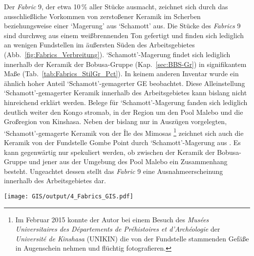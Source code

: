Der \textit{Fabric} 9, der etwa 10\,\% aller Stücke ausmacht, zeichnet sich durch das ausschließliche Vorkommen von zerstoßener Keramik im Scherben beziehungsweise einer \enquote*{Magerung} aus \enquote*{Schamott} aus. Die Stücke des \textit{Fabrics} 9 sind durchweg aus einem weißbrennenden Ton gefertigt und finden sich lediglich an wenigen Fundstellen im äußersten Süden des Arbeitsgebietes (Abb.~\ref{fig:Fabrics_Verbreitung}). \enquote*{Schamott}-Magerung findet sich lediglich innerhalb der Keramik der Bobusa-Gruppe (Kap.~\ref{sec:BBS-Gr}) in signifikantem Maße (Tab.~\ref{tab:Fabrics_StilGr_Pct}). In keinem anderen Inventar wurde ein ähnlich hoher Anteil \enquote*{Schamott}-gemagerter GE beobachtet. Diese Alleinstellung \enquote*{Schamott}-gemagerter Keramik innerhalb des Arbeitsgebietes kann bislang nicht hinreichend erklärt werden. Belege für \enquote*{Schamott}-Magerung fanden sich lediglich deutlich weiter den Kongo stromab, in der Region um den Pool Malebo und die Großregion von Kinshasa. Neben der bislang nur in Auszügen vorgelegten, \enquote*{Schamott}-gemagerte Keramik von der Île des Mimosas \parencite[Abb.~\ref{fig:Mimosas_Mim26}; siehe][279f.]{Eggert.1984}\footnote{Im Februar 2015 konnte der Autor bei einem Besuch des \textit{Musées Universitaires des Départements de Préhistoires et d'Archéologie} der \textit{Université de Kinshasa} (UNIKIN) die von der Fundstelle stammenden Gefäße in Augenschein nehmen und flüchtig fotografieren.} zeichnet sich auch die Keramik von der Fundstelle Gombe Point durch \enquote*{Schamott}-Magerung aus \parencite[586]{Cahen.1976}. Es kann gegenwärtig nur spekuliert werden, ob zwischen der Keramik der Bobusa-Gruppe und jener aus der Umgebung des Pool Malebo ein Zusammenhang besteht. Ungeachtet dessen stellt das \textit{Fabric} 9 eine Ausnahmeerscheinung innerhalb des Arbeitsgebietes dar. 

\begin{figure*}[p]
	\centering
	\texttt{[image: GIS/output/4\_Fabrics\_GIS.pdf]}
	\caption{\textit{Fabrics}: Anteilige Verbreitung im Arbeitsgebiet. Kartiert sind ausschließlich Fundplätze mit mehr als 5~GE. Für das östlich angrenzende Innere Kongobecken \parencite[siehe][]{Wotzka.1995} kann mangels entsprechender Untersuchungen eine flächige Verbreitung des \textit{Fabric} 1 lediglich angenommen werden (siehe auch Anm.~\ref{ftn:Sandmagerung}).}
	\label{fig:Fabrics_Verbreitung}
\end{figure*}

\begin{table*}[!tb]
	\centering
	{\small
		
	}
	\caption{\textit{Fabrics}: Prozentualer Anteil an den Stilgruppen-Inventaren (Kap.~\ref{sec:Keramiksequenz}).}
\label{tab:Fabrics_StilGr_Pct}
\end{table*}

